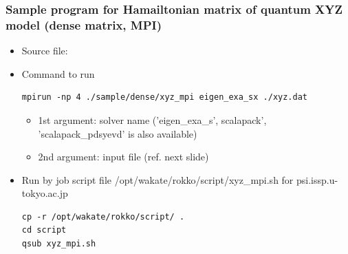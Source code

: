 \begin{frame}[c,fragile]
  \frametitle{Sample program for Hamailtonian matrix of quantum XYZ model (dense matrix, MPI)}
  \begin{itemize}
    \item Source file: 
    \item Command to run
\begin{lstlisting}[style=shstyle]
mpirun -np 4 ./sample/dense/xyz_mpi eigen_exa_sx ./xyz.dat
\end{lstlisting}
    \begin{itemize}
    \item 1st argument: solver name ('eigen_exa_s', scalapack', 'scalapack_pdsyevd' is also available) \\
    \item 2nd argument: input file (ref. next slide)
    \end{itemize}
  \item Run by job script file /opt/wakate/rokko/script/xyz_mpi.sh for psi.issp.u-tokyo.ac.jp
\begin{lstlisting}[style=shstyle]
cp -r /opt/wakate/rokko/script/ .
cd script
qsub xyz_mpi.sh
\end{lstlisting}
\end{itemize}
\end{frame}


